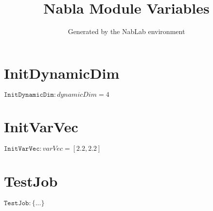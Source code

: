 \documentclass[11pt]{article}
\title{Nabla Module Variables}
\author{Generated by the NabLab environment}
\begin{document}
\maketitle


\section{InitDynamicDim}
$\texttt{InitDynamicDim} : dynamicDim = 4$


\section{InitVarVec}
$\texttt{InitVarVec} : varVec = \left[2.2,2.2\right]$


\section{TestJob}
$\texttt{TestJob} : \{ ... \}$
\end{document}

